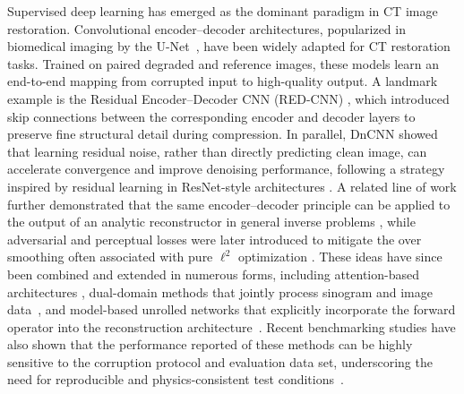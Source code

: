 Supervised deep learning has emerged as the dominant paradigm in CT image restoration. Convolutional encoder--decoder architectures, popularized in biomedical imaging by the U-Net~\cite{Ronneberger2015}, have been widely adapted for CT restoration tasks. Trained on paired degraded and reference images, these models learn an end-to-end mapping from corrupted input to high-quality output. A landmark example is the Residual Encoder--Decoder CNN (RED-CNN) \cite{Chen2017}, which introduced skip connections between the corresponding encoder and decoder layers to preserve fine structural detail during compression. In parallel, DnCNN \cite{Zhang2017} showed that learning residual noise, rather than directly predicting clean image, can accelerate convergence and improve denoising performance, following a strategy inspired by residual learning in ResNet-style architectures \cite{He2016}. A related line of work further demonstrated that the same encoder--decoder principle can be applied to the output of an analytic reconstructor in general inverse problems \cite{Jin2017}, while adversarial and perceptual losses were later introduced to mitigate the over smoothing often associated with pure $\ell^{2}$ optimization \cite{Yang2018WGAN}. These ideas have since been combined and extended in numerous forms, including attention-based architectures \cite{Komolafe2024, Zhang2023}, dual-domain methods that jointly process sinogram and image data~\cite{Wang2020, Zhang2022, Lin2019DuDoNet}, and model-based unrolled networks that explicitly incorporate the forward operator into the reconstruction architecture~\cite{Aggarwal2019MoDL, Hammernik2018VarNet}. Recent benchmarking studies have also shown that the performance reported of these methods can be highly sensitive to the corruption protocol and evaluation data set, underscoring the need for reproducible and physics-consistent test conditions~\cite{Kiss2024}.

